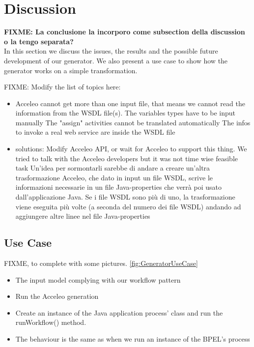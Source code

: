 \section{Discussion}
\label{Discussion}
\textbf{FIXME: La conclusione la incorporo come subsection della discussion o la tengo separata? }\\
In this section we discuss the issues, the results and the possible future development of our generator. We also present a use case to show how the generator works on a simple transformation.

FIXME: Modify the list of topics here:
\begin{itemize}
 \item Acceleo cannot get more than one input file, that means we cannot read the information from the WSDL file(s).
  \subitem The variables types have to be input manually
  \subitem The "assign" activities cannot be translated automatically
  \subitem The infos to invoke a real web service are inside the WSDL file
 \item solutions:
  \subitem Modify Acceleo API, or wait for Acceleo to support this thing.
  \subsubitem We tried to talk with the Acceleo developers but it was not time wise feasible task
  \subitem Un'idea per sormontarli sarebbe di andare a creare un'altra trasformazione Acceleo, che dato in input un file WSDL, scrive le informazioni necessarie in un file Java-properties che verrà poi usato dall'applicazione Java. Se i file WSDL sono più di uno, la trasformazione viene eseguita più volte (a seconda del numero dei file WSDL) andando ad aggiungere altre linee nel file Java-properties
\end{itemize}

\subsection{Use Case}
\label{sec:UseCase}
FIXME, to complete with some pictures. \ref{fig:GeneratorUseCase}
\begin{itemize}
 \item The input model complying with our workflow pattern
 \item Run the Acceleo generation
 \item Create an instance of the Java application process' class and run the runWorkflow() method.
 \item The behaviour is the same as when we run an instance of the BPEL's process 
\end{itemize}

